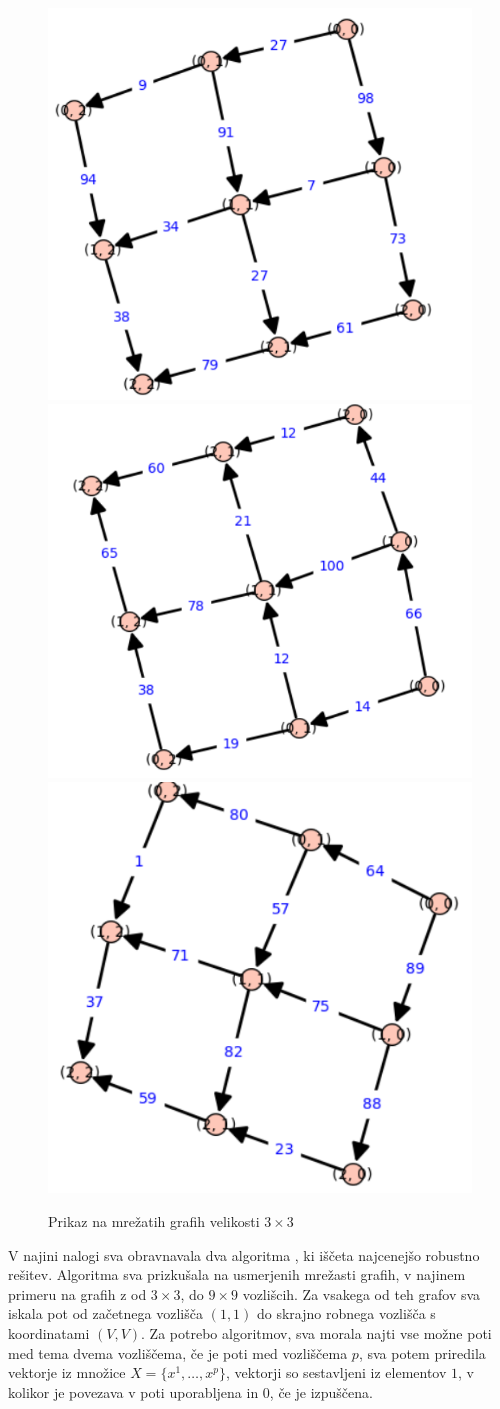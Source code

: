\documentclass[a4paper, 12 pt]{article}
\theoremstyle{definition} %
\theoremstyle{plain} %
\theoremstyle{definition}
\begin{document}
\begin{figure}[H]
    \includegraphics[width=.5\textwidth]{prvi.png}\hfill
    \includegraphics[width=.5\textwidth]{drugi.png}\hfill
    \includegraphics[width=.5\textwidth]{tretji.png}\hfill
    \\[\smallskipamount]
    \caption{Prikaz na mrežatih grafih velikosti $3 \times 3$}\label{fig:foobar}
\end{figure}

  
V najini nalogi sva obravnavala dva algoritma , ki iščeta najcenejšo robustno rešitev. Algoritma sva prizkušala na usmerjenih mrežasti grafih, v najinem primeru na grafih  z od $3\times3$, do $9\times9$ vozlišcih. Za vsakega od teh grafov sva iskala pot od začetnega vozlišča $(1, 1)$ do skrajno robnega vozlišča s koordinatami $(V, V)$. Za potrebo algoritmov, sva morala najti vse možne poti med tema dvema vozliščema, če je poti med vozliščema $p$, sva potem priredila vektorje iz množice $X = \{x^1, \dots, x^p \}$, vektorji so sestavljeni iz elementov $1$, v kolikor je povezava v poti uporabljena in $0$, če je izpuščena.\newline
\end{document}
